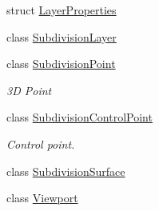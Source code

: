 \begin{DoxyCompactItemize}
\item 
struct \hyperlink{structShipCADGeometry_1_1LayerProperties}{Layer\-Properties}
\item 
class \hyperlink{classShipCADGeometry_1_1SubdivisionLayer}{Subdivision\-Layer}
\item 
class \hyperlink{classShipCADGeometry_1_1SubdivisionPoint}{Subdivision\-Point}
\begin{DoxyCompactList}\small\item\em 3\-D Point \end{DoxyCompactList}\item 
class \hyperlink{classShipCADGeometry_1_1SubdivisionControlPoint}{Subdivision\-Control\-Point}
\begin{DoxyCompactList}\small\item\em Control point. \end{DoxyCompactList}\item 
class \hyperlink{classShipCADGeometry_1_1SubdivisionSurface}{Subdivision\-Surface}
\item 
class \hyperlink{classShipCADGeometry_1_1Viewport}{Viewport}
\end{DoxyCompactItemize}
